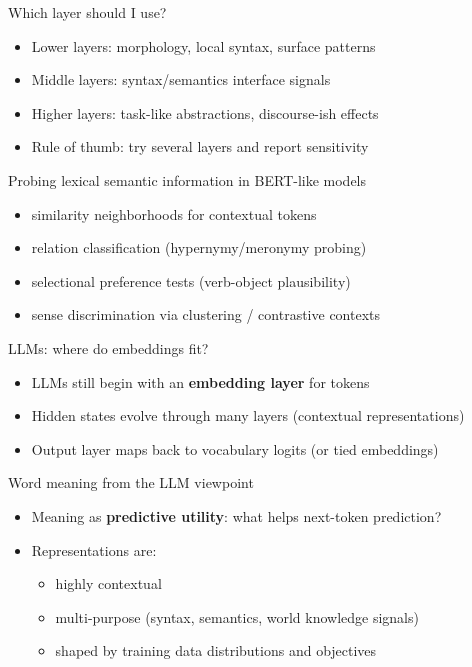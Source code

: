 \documentclass{beamer}
\begin{document}
\begin{frame}{Which layer should I use?}
\begin{itemize}
  \item Lower layers: morphology, local syntax, surface patterns
  \item Middle layers: syntax/semantics interface signals
  \item Higher layers: task-like abstractions, discourse-ish effects
  \item Rule of thumb: try several layers and report sensitivity
\end{itemize}
\end{frame}

\begin{frame}{Probing lexical semantic information in BERT-like models}
\begin{itemize}
  \item similarity neighborhoods for contextual tokens
  \item relation classification (hypernymy/meronymy probing)
  \item selectional preference tests (verb-object plausibility)
  \item sense discrimination via clustering / contrastive contexts
\end{itemize}
\end{frame}

\begin{frame}{LLMs: where do embeddings fit?}
\begin{itemize}
  \item LLMs still begin with an \textbf{embedding layer} for tokens
  \item Hidden states evolve through many layers (contextual representations)
  \item Output layer maps back to vocabulary logits (or tied embeddings)
\end{itemize}
\end{frame}

\begin{frame}{Word meaning from the LLM viewpoint}
\begin{itemize}
  \item Meaning as \textbf{predictive utility}: what helps next-token prediction?
  \item Representations are:
  \begin{itemize}
    \item highly contextual
    \item multi-purpose (syntax, semantics, world knowledge signals)
    \item shaped by training data distributions and objectives
  \end{itemize}
\end{itemize}
\end{frame}
\end{document}
